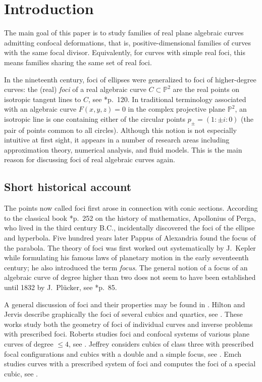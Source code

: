 \documentclass[11pt]{amsart}
\theoremstyle{definition}
\theoremstyle{remark}
\newcommand{\bP}{\mathbb{P}}
\begin{document}
\section{Introduction}

The main goal of this paper is to study families of real plane algebraic curves admitting confocal deformations, that is, positive-dimensional families of curves with the same focal divisor.  Equivalently, for curves with simple real foci, this means families sharing the same set of real foci.

In the nineteenth century, foci of ellipses were generalized to foci of higher-degree curves: the (real) \emph{foci} of a real algebraic curve $C \subset \bP^2$ are the real points on isotropic tangent lines to $C$, see \cite{Sa}*{p.~120}. In traditional terminology associated with an algebraic curve $F(x,y,z)=0$ in the complex projective plane $\bP^2$, an isotropic line is one containing either of the circular points $p_\pm=(1:\pm i :0)$ (the pair of points common to all circles). Although this notion is not especially intuitive at first sight, it appears in a number of research areas including approximation theory, numerical analysis, and fluid models. This is the main reason for discussing foci of real algebraic curves again.


\subsection*{Short historical account}
\label{sec:int}
 The points now called foci first arose in connection with conic sections. According to the classical book \cite{Go}*{p.~252} on the history of mathematics, Apollonius of Perga, who lived in the third century B.C., incidentally discovered the foci of the ellipse and hyperbola. Five hundred years later Pappus of Alexandria found the focus of the parabola. The theory of foci was first worked out systematically by J.~Kepler while formulating his famous laws of planetary motion in the early seventeenth century; he also introduced the term \emph{focus}. The general notion of a focus of an algebraic curve of degree higher than two does not seem to have been established until 1832 by J.~Pl\"ucker, see \cite{Pl}*{p.~85}.

A general discussion of foci and their properties may be found in \cite{An, Sa, Ba, Wi, Hi, Co, Ri, Ich}.  Hilton and Jervis describe graphically the foci of several cubics and quartics, see \cite{HiJe}. 
These works study both the geometry of foci of individual curves and inverse problems with prescribed foci.
Roberts studies foci and confocal systems of various plane curves of degree $\le 4$, see \cite{Roberts1901,Roberts1904}. Jeffrey considers cubics of class three with prescribed focal configurations and cubics with a double and a simple focus, see \cite{Je,Je2}. Emch studies curves with a prescribed system of foci and computes the foci of a special cubic, see \cite{Emch}.
\end{document}
